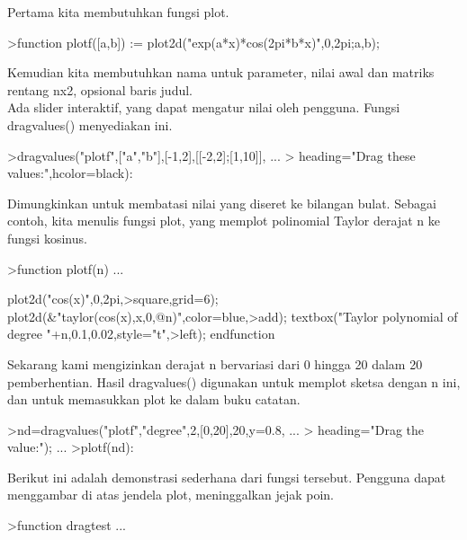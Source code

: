 \documentclass{article}
\begin{document}
\begin{eulernotebook}
\begin{eulercomment}
\begin{eulercomment}
\begin{eulercomment}
\begin{eulercomment}
\begin{eulercomment}
Pertama kita membutuhkan fungsi plot.
\end{eulercomment}
\begin{eulerprompt}
>function plotf([a,b]) := plot2d("exp(a*x)*cos(2pi*b*x)",0,2pi;a,b);
\end{eulerprompt}
\begin{eulercomment}
Kemudian kita membutuhkan nama untuk parameter, nilai awal dan matriks
rentang nx2, opsional baris judul.\\
Ada slider interaktif, yang dapat mengatur nilai oleh pengguna. Fungsi
dragvalues() menyediakan ini.
\end{eulercomment}
\begin{eulerprompt}
>dragvalues("plotf",["a","b"],[-1,2],[[-2,2];[1,10]], ...
>  heading="Drag these values:",hcolor=black):
\end{eulerprompt}
\begin{eulercomment}
Dimungkinkan untuk membatasi nilai yang diseret ke bilangan bulat.
Sebagai contoh, kita menulis fungsi plot, yang memplot polinomial
Taylor derajat n ke fungsi kosinus.
\end{eulercomment}
\begin{eulerprompt}
>function plotf(n) ...
\end{eulerprompt}
\begin{eulerudf}
  plot2d("cos(x)",0,2pi,>square,grid=6);
  plot2d(&"taylor(cos(x),x,0,@n)",color=blue,>add);
  textbox("Taylor polynomial of degree "+n,0.1,0.02,style="t",>left);
  endfunction
\end{eulerudf}
\begin{eulercomment}
Sekarang kami mengizinkan derajat n bervariasi dari 0 hingga 20 dalam
20 pemberhentian. Hasil dragvalues() digunakan untuk memplot sketsa
dengan n ini, dan untuk memasukkan plot ke dalam buku catatan.
\end{eulercomment}
\begin{eulerprompt}
>nd=dragvalues("plotf","degree",2,[0,20],20,y=0.8, ...
>   heading="Drag the value:"); ...
>plotf(nd):
\end{eulerprompt}
\begin{eulercomment}
Berikut ini adalah demonstrasi sederhana dari fungsi tersebut.
Pengguna dapat menggambar di atas jendela plot, meninggalkan jejak
poin.
\end{eulercomment}
\begin{eulerprompt}
>function dragtest ...

\end{eulerprompt}
\end{eulercomment}
\end{eulercomment}
\end{eulercomment}
\end{eulercomment}
\end{eulernotebook}
\end{document}

